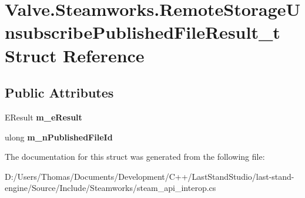 \hypertarget{structValve_1_1Steamworks_1_1RemoteStorageUnsubscribePublishedFileResult__t}{}\section{Valve.\+Steamworks.\+Remote\+Storage\+Unsubscribe\+Published\+File\+Result\+\_\+t Struct Reference}
\label{structValve_1_1Steamworks_1_1RemoteStorageUnsubscribePublishedFileResult__t}
\subsection*{Public Attributes}
\begin{DoxyCompactItemize}
\item 
\hypertarget{structValve_1_1Steamworks_1_1RemoteStorageUnsubscribePublishedFileResult__t_ab12beec25bc071bb6ae9b4d4da062b4b}{}E\+Result {\bfseries m\+\_\+e\+Result}\label{structValve_1_1Steamworks_1_1RemoteStorageUnsubscribePublishedFileResult__t_ab12beec25bc071bb6ae9b4d4da062b4b}

\item 
\hypertarget{structValve_1_1Steamworks_1_1RemoteStorageUnsubscribePublishedFileResult__t_af3e4e1c632a59530f79bf1f71f3152eb}{}ulong {\bfseries m\+\_\+n\+Published\+File\+Id}\label{structValve_1_1Steamworks_1_1RemoteStorageUnsubscribePublishedFileResult__t_af3e4e1c632a59530f79bf1f71f3152eb}

\end{DoxyCompactItemize}


The documentation for this struct was generated from the following file\+:\begin{DoxyCompactItemize}
\item 
D\+:/\+Users/\+Thomas/\+Documents/\+Development/\+C++/\+Last\+Stand\+Studio/last-\/stand-\/engine/\+Source/\+Include/\+Steamworks/steam\+\_\+api\+\_\+interop.\+cs\end{DoxyCompactItemize}
